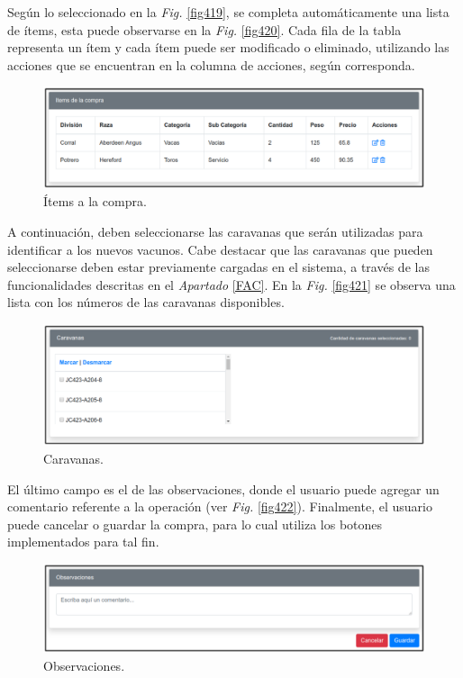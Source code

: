 \documentclass[11pt,oneside]{book}
\begin{document}
\newpage
Según lo seleccionado en la \textit{Fig.} \eqref{fig419}, se completa automáticamente una lista de ítems, esta puede observarse en la \textit{Fig.} \eqref{fig420}. Cada fila de la tabla representa un ítem y cada ítem puede ser modificado o eliminado, utilizando las acciones que se encuentran en la columna de acciones, según corresponda.
\begin{figure}[tbhp]
\centerline{\includegraphics[scale=0.87]{figs/capitulo_4_desarrollo/fig420.pdf}}
\caption{Ítems a la compra.}
\label{fig420}
\end{figure}

A continuación, deben seleccionarse las caravanas que serán utilizadas para identificar a los nuevos vacunos. Cabe destacar que las caravanas que pueden seleccionarse deben estar previamente cargadas en el sistema, a través de las funcionalidades descritas en el \textit{Apartado} \eqref{FAC}. En la \textit{Fig.} \eqref{fig421} se observa una lista con los números de las caravanas disponibles.

\begin{figure}[tbhp]
\centerline{\includegraphics[scale=0.87]{figs/capitulo_4_desarrollo/fig421.pdf}}
\caption{Caravanas.}
\label{fig421}
\end{figure}

\newpage
El último campo es el de las observaciones, donde el usuario puede agregar un comentario referente a la operación (ver \textit{Fig.} \eqref{fig422}). Finalmente, el usuario puede cancelar o guardar la compra, para lo cual utiliza los botones implementados para tal fin. 
\begin{figure}[tbhp]
\centerline{\includegraphics[scale=0.87]{figs/capitulo_4_desarrollo/fig422.pdf}}
\caption{Observaciones.}
\label{fig422}
\end{figure}
\end{document}
